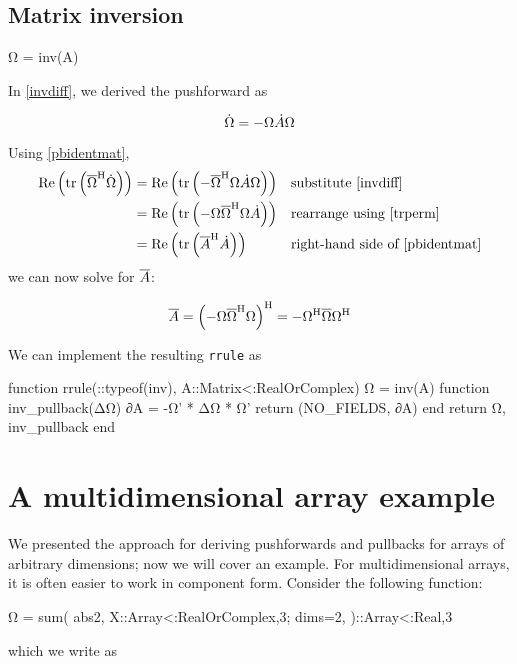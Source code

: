 \documentclass[../../main.tex]{subfiles}
\begin{document}
\begin{refsection}
\subsection{Matrix inversion}\label{matrix-inversion-1}
\begin{juliacode}
Ω = inv(A)
\end{juliacode}
In \eqref{invdiff}, we derived the pushforward as

\[\dot{\Omega} = -\Omega \dot{A} \Omega\]

Using \eqref{pbidentmat},
\begin{align*}
	\Re\left( \tr \left(
		{\overline{\Omega}}^\mathrm{H} \dot{\Omega}
		\right) \right)
	 & = \Re\left( \tr \left(
		-{\overline{\Omega}}^\mathrm{H} \Omega \dot{A} \Omega
		\right) \right)
	 &                        & \text{substitute } \eqref{invdiff}            \\
	 & = \Re\left( \tr \left(
		-\Omega {\overline{\Omega}}^\mathrm{H} \Omega \dot{A}
		\right) \right)
	 &                        & \text{rearrange using } \eqref{trperm}        \\
	 & = \Re\left( \tr \left(
		{\overline{A}}^\mathrm{H} \dot{A}
		\right) \right)
	 &                        & \text{right-hand side of } \eqref{pbidentmat}
\end{align*}
we can now solve for $\overline{A}$:

\[\overline{A} = {\left( -\Omega {\overline{\Omega}}^\mathrm{H} \Omega \right)}^\mathrm{H}
	= -{\Omega}^\mathrm{H} \overline{\Omega} {\Omega}^\mathrm{H}\]

We can implement the resulting \texttt{rrule} as
\begin{juliacode}
function rrule(::typeof(inv), A::Matrix{<:RealOrComplex})
    Ω = inv(A)
    function inv_pullback(ΔΩ)
        ∂A = -Ω' * ΔΩ * Ω'
        return (NO_FIELDS, ∂A)
    end
    return Ω, inv_pullback
end
\end{juliacode}
\section{A multidimensional array example}\label{a-multidimensional-array-example}

We presented the approach for deriving pushforwards and pullbacks for arrays of arbitrary dimensions; now we will cover an example.
For multidimensional arrays, it is often easier to work in component form.
Consider the following function:
\begin{juliacode}
Ω = sum(
    abs2,
    X::Array{<:RealOrComplex,3};
    dims=2,
)::Array{<:Real,3}
\end{juliacode}
which we write as


\end{refsection}
\end{document}
